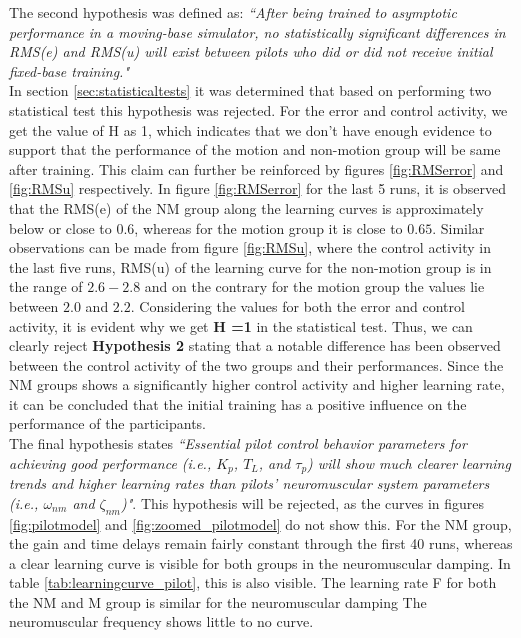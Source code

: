 \documentclass[conference]{IEEEtran}
\begin{document}



The second hypothesis was defined as: \textit{``After being trained to asymptotic performance in a moving-base simulator, no statistically significant differences in RMS(e) and RMS(u) will exist between pilots who did or did not receive initial fixed-base training."}\\


In section \ref{sec:statisticaltests} it was determined that based on performing two statistical test this hypothesis was rejected. For the error and control activity, we get the value of H as 1, which indicates that we don't have enough evidence to support that the performance of the motion and non-motion group will be same after training. This claim can further be reinforced by figures \ref{fig:RMSerror} and \ref{fig:RMSu} respectively. In figure \ref{fig:RMSerror} for the last 5 runs, it is observed that the RMS(e) of the NM group along the learning curves is approximately below or close to $0.6$, whereas for the motion group  it is close to $0.65$. Similar observations can be made from figure \ref{fig:RMSu}, where the control activity in the last five runs, RMS(u) of the learning curve for the non-motion group is in the range of $2.6 - 2.8$ and on the contrary for the motion group the values lie between $2.0$ and $2.2$. Considering the values for both the error and control activity, it is evident why we get \textbf{H =1} in the statistical test. Thus, we can clearly reject \textbf{Hypothesis 2} stating that a notable difference has been observed between the control activity of the two groups and their performances. Since the NM groups shows a significantly higher control activity and higher learning rate, it can be concluded that the initial training has a positive influence on the performance of the participants.\\


The final hypothesis states \textit{``Essential pilot control behavior parameters for achieving good performance (i.e., $K_p$, $T_L$, and $\tau_p$) will show much clearer learning trends and higher learning rates than pilots’ neuromuscular system parameters (i.e., $\omega_{nm}$ and $\zeta_{nm}$)"}. This hypothesis will be rejected, as the curves in figures \ref{fig:pilotmodel} and \ref{fig:zoomed_pilotmodel} do not show this. For the NM group, the gain and time delays remain fairly constant through the first 40 runs, whereas a clear learning curve is visible for both groups in the neuromuscular damping. In table \ref{tab:learningcurve_pilot}, this is also visible. The learning rate F for both the NM and M group is similar for the neuromuscular damping The neuromuscular frequency shows little to no curve. \\
\end{document}

